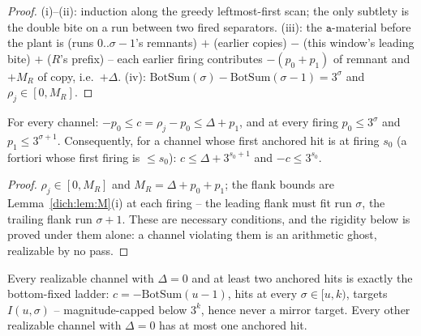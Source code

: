 \documentclass[runningheads,envcountsect]{llncs}
\begin{document}
\begin{proof}
    (i)--(ii): induction along the greedy leftmost-first scan; the only subtlety is the double bite on a run between two fired separators. (iii): the $\mathtt a$-material before the plant is (runs $0..\sigma{-}1$'s remnants) $+$ (earlier copies) $-$ (this window's leading bite) $+$ ($R$'s prefix) -- each earlier firing contributes $-(p_0 + p_1)$ of remnant and $+M_R$ of copy, i.e.\ $+\Delta$. (iv): $\mathrm{BotSum}(\sigma) - \mathrm{BotSum}(\sigma{-}1) = 3^{\sigma}$ and $\rho_j \in [0, M_R]$.
\end{proof}

\begin{lemma}[realizability]
    \label{dich:lem:FIT}
    For every channel: $-p_0 \le c = \rho_j - p_0 \le \Delta + p_1$, and at every firing $p_0 \le 3^{\sigma}$ and $p_1 \le 3^{\sigma+1}$. Consequently, for a channel whose first anchored hit is at firing $s_0$ (a fortiori whose first firing is $\le s_0$): $c \le \Delta + 3^{s_0+1}$ and $-c \le 3^{s_0}$.
\end{lemma}

\begin{proof}
    $\rho_j \in [0, M_R]$ and $M_R = \Delta + p_0 + p_1$; the flank bounds are Lemma~\ref{dich:lem:M}(i) at each firing -- the leading flank must fit run $\sigma$, the trailing flank run $\sigma{+}1$. These are necessary conditions, and the rigidity below is proved under them alone: a channel violating them is an arithmetic ghost, realizable by no pass.
\end{proof}

\begin{lemma}
    \label{dich:lem:K2}
    Every realizable channel with $\Delta = 0$ and at least two anchored hits is exactly the bottom-fixed ladder: $c = -\mathrm{BotSum}(u{-}1)$, hits at every $\sigma \in [u, k)$, targets $I(u, \sigma)$ -- magnitude-capped below $3^k$, hence never a mirror target. Every other realizable channel with $\Delta = 0$ has at most one anchored hit.
\end{lemma}
\end{document}
